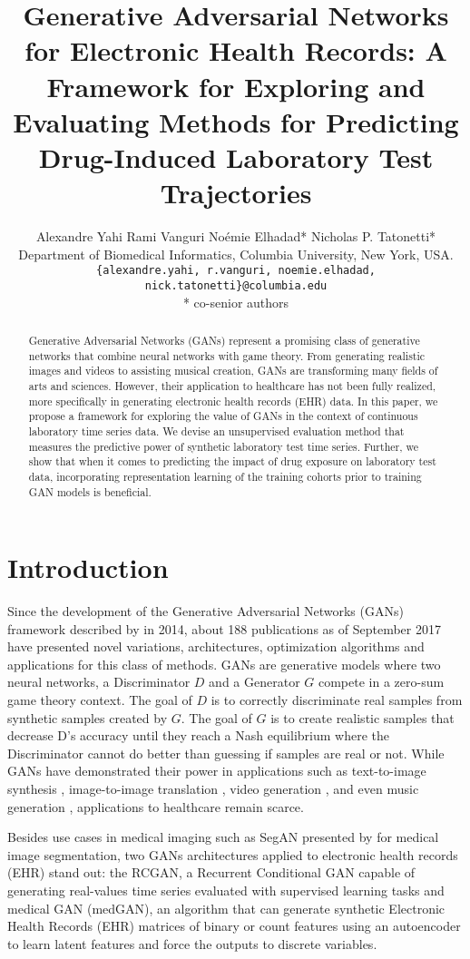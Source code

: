 \documentclass{article}
\title{Generative Adversarial Networks for Electronic Health Records: A Framework for Exploring and Evaluating Methods for Predicting Drug-Induced Laboratory Test Trajectories}
\author{
	  Alexandre Yahi \quad Rami Vanguri \quad No\'emie Elhadad* \quad Nicholas P. Tatonetti*\\
	  Department of Biomedical Informatics, Columbia University, New York, USA.\\
	\texttt{\{alexandre.yahi, r.vanguri, noemie.elhadad, nick.tatonetti\}@columbia.edu} \\
	* co-senior authors
}
\begin{document}

\maketitle

\begin{abstract}
Generative Adversarial Networks (GANs) represent a promising class of generative networks that combine neural networks with game theory. From generating realistic images and videos to assisting musical creation, GANs are transforming many fields of arts and sciences. However, their application to healthcare has not been fully realized, more specifically in generating electronic health records (EHR) data. In this paper, we propose a framework for exploring the value of GANs in the context of continuous laboratory time series data. We devise an unsupervised evaluation method that measures the predictive power of synthetic laboratory test time series. Further, we show that when it comes to predicting the impact of drug exposure on laboratory test data, incorporating representation learning of the training cohorts prior to training GAN models is beneficial.    
\end{abstract}

\section{Introduction}
Since the development of the Generative Adversarial Networks (GANs) framework described by \citet{goodfellow2014generative} in 2014, about 188 publications as of September 2017 have presented  novel variations, architectures, optimization algorithms and applications for this class of methods. GANs are generative models where two neural networks, a Discriminator $D$ and a Generator $G$ compete in a zero-sum game theory context. The goal of $D$ is to correctly discriminate real samples from synthetic samples created by $G$. The goal of $G$ is to create realistic samples that decrease D's accuracy until they reach a Nash equilibrium where the Discriminator cannot do better than guessing if samples are real or not. While GANs have demonstrated their power in applications such as text-to-image synthesis \cite{reed2016generative, zhang2016stackgan}, image-to-image translation \cite{isola2016image}, video generation \cite{vondrick2016generating}, and even music generation \cite{yang2017midinet}, applications to healthcare remain scarce.

Besides use cases in medical imaging such as SegAN presented by \citet{xue2017segan} for medical image segmentation, two GANs architectures applied to electronic health records (EHR) stand out: the RCGAN, a Recurrent Conditional GAN capable of generating real-values time series evaluated with supervised learning tasks \cite{esteban2017real} and medical GAN (medGAN)\cite{choi2017generating}, an algorithm that can generate synthetic Electronic Health Records (EHR) matrices of binary or count features using an autoencoder to learn latent features and force the outputs to discrete variables.
\end{document}
